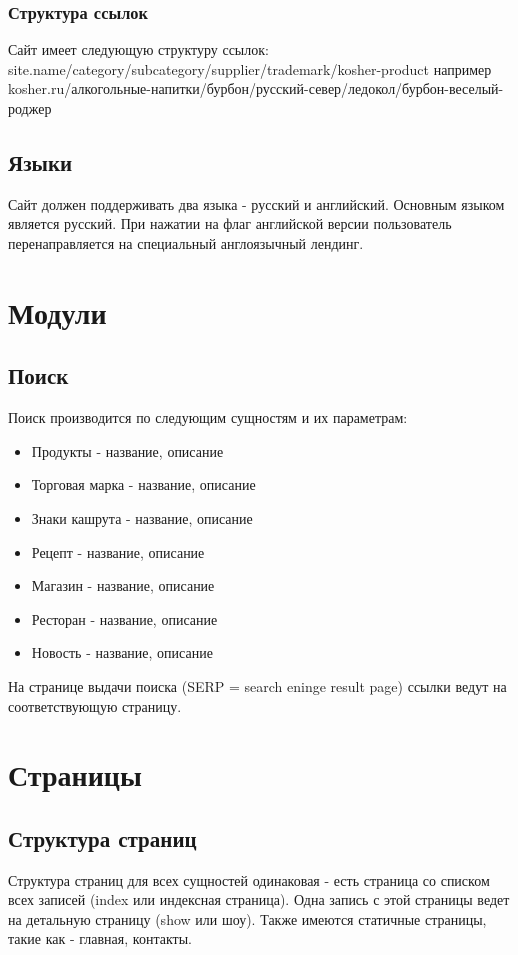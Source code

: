 \documentclass[DIV=calc, paper=a4, fontsize=11pt]{scrartcl} %
\begin{document}
\subsubsection{Структура ссылок}
Сайт имеет следующую структуру ссылок:
site.name/category/subcategory/supplier/trademark/kosher-product
например
kosher.ru/алкогольные-напитки/бурбон/русский-север/ледокол/бурбон-веселый-роджер

\subsection{Языки}
Сайт должен поддерживать два языка - русский и английский. Основным языком является русский. При нажатии на флаг английской версии пользователь перенаправляется на специальный англоязычный лендинг.


\section{Модули}

\subsection{Поиск}
Поиск производится по следующим сущностям и их параметрам:
\begin{itemize}
	\item Продукты - название, описание
	\item Торговая марка - название, описание 
	\item Знаки кашрута - название, описание
	\item Рецепт - название, описание
	\item Магазин - название, описание
	\item Ресторан - название, описание
	\item Новость - название, описание
\end{itemize}
На странице выдачи поиска (SERP = search eninge result page) ссылки ведут на соответствующую страницу.

\section{Страницы}

\subsection{Структура страниц}
Структура страниц для всех сущностей одинаковая - есть страница со списком всех записей (index или индексная страница). Одна запись с этой страницы ведет на детальную страницу (show или шоу). Также имеются статичные страницы, такие как - главная, контакты.
\end{document}
